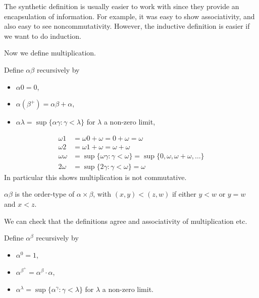\documentclass[a4paper]{article}
\begin{document}
The synthetic definition is usually easier to work with since they provide an encapsulation of information. For example, it was easy to show associativity, and also easy to see noncommutativity. However, the inductive definition is easier if we want to do induction.

Now we define multiplication.

\begin{definition}
  Define \(\alpha\beta\) recursively by
  \begin{itemize}
  \item \(\alpha 0 = 0\),
  \item \(\alpha(\beta^+) = \alpha\beta + \alpha\),
  \item \(\alpha\lambda = \sup\{\alpha\gamma: \gamma < \lambda\}\) for \(\lambda\) a non-zero limit,
  \end{itemize}
\end{definition}

\begin{eg}
  \begin{align*}
    \omega 1 &= \omega 0 + \omega = 0 + \omega = \omega \\
    \omega 2 &= \omega 1 + \omega = \omega + \omega \\
    \omega\omega &= \sup \{\omega\gamma: \gamma < \omega\} = \sup \{0, \omega, \omega + \omega, \dots\} \\
    2 \omega &= \sup \{2\gamma: \gamma < \omega\} = \omega
  \end{align*}
  In particular this shows multiplication is not commutative.
\end{eg}

\begin{definition}
  \(\alpha\beta\) is the order-type of \(\alpha \times \beta\), with \((x, y) < (z, w)\) if either \(y < w\) or \(y = w\) and \(x < z\).
\end{definition}

We can check that the definitions agree and associativity of multiplication etc.

\begin{definition}
  Define \(\alpha^\beta\) recursively by
  \begin{itemize}
  \item \(\alpha^0 = 1\),
  \item \(\alpha^{\beta^+} = \alpha^\beta \cdot \alpha\),
  \item \(\alpha^\lambda = \sup\{\alpha^\gamma: \gamma < \lambda\}\) for \(\lambda\) a non-zero limit.
  \end{itemize}
\end{definition}
\end{document}
